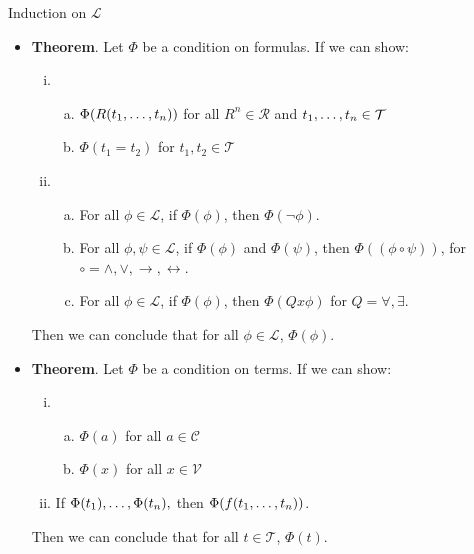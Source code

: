 \begin{frame}{Induction on $\mathcal{L}$}

	\begin{itemize}
	
		\item \textbf{Theorem}. Let $\Phi$ be a condition on formulas. If we can show:
		\begin{enumerate}[(i)]
		
			\item  \begin{enumerate}[(a)]
			
				\item $\Phi(R(t_1,\mathellipsis, t_n))$ for all $R^n\in \mathcal{R}$ and $t_1,\mathellipsis, t_n\in\mathcal{T}$
				
				\item $\Phi(t_1=t_2)$ for $t_1,t_2\in \mathcal{T}$
			
			\end{enumerate}
			
			\item \begin{enumerate}[(a)]
			
			\item For all $\phi\in\mathcal{L}$, if $\Phi(\phi)$, then $\Phi(\neg\phi)$.

			\item For all $\phi,\psi\in\mathcal{L}$, if $\Phi(\phi)$ and $\Phi(\psi)$, then $\Phi((\phi\circ\psi))$, for $\circ=\land,\lor,\to,\leftrightarrow$.
			
			\item For all $\phi\in\mathcal{L}$, if $\Phi(\phi)$, then $\Phi(Qx\phi)$ for $Q=\forall,\exists$.

		
		\end{enumerate}
		\end{enumerate}
		Then we can conclude that for all $\phi\in\mathcal{L}$, $\Phi(\phi)$. 

	\item \textbf{Theorem}.  Let $\Phi$ be a condition on terms. If we can show:
		\begin{enumerate}[(i)]
		
			\item  \begin{enumerate}[(a)]
			
				\item $\Phi(a)$ for all $a\in\mathcal{C}$
				
				\item $\Phi(x)$ for all $x\in\mathcal{V}$
			
			\end{enumerate}
			
			\item If $\Phi(t_1), \mathellipsis,\Phi(t_n),$ then $\Phi(f(t_1,\mathellipsis,t_n))$.
		\end{enumerate}
		Then we can conclude that for all $t\in\mathcal{T}$, $\Phi(t)$.
	
	\end{itemize}


\end{frame}

